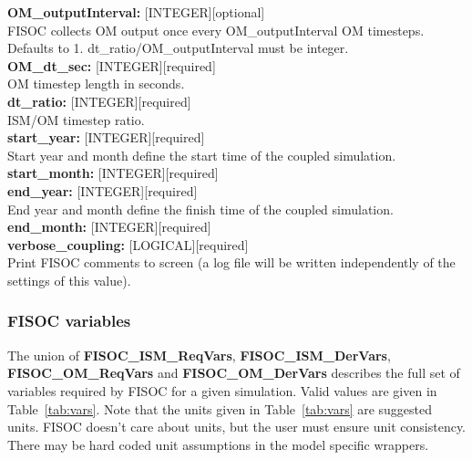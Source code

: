 \documentclass[12pt]{article}
\begin{document}
\begin{flushleft}
\textbf{OM\_outputInterval:} [INTEGER][optional]                           \\
FISOC collects OM output once every OM\_outputInterval OM timesteps. 
Defaults to 1.  dt\_ratio/OM\_outputInterval must be integer.              \\
\vspace{6pt}
\textbf{OM\_dt\_sec:}         [INTEGER][required]                          \\
OM timestep length in seconds.                                             \\
\vspace{6pt}
\textbf{dt\_ratio:}          [INTEGER][required]                           \\
ISM/OM timestep ratio.                                                     \\
\vspace{6pt}
\textbf{start\_year:}        [INTEGER][required]                           \\
Start year and month define the start time of the coupled simulation.      \\
\vspace{6pt}
\textbf{start\_month:}       [INTEGER][required]                           \\
\vspace{6pt}
\textbf{end\_year:}          [INTEGER][required]                           \\
End year and month define the finish time of the coupled simulation.       \\
\vspace{6pt}
\textbf{end\_month:}         [INTEGER][required]                           \\
\vspace{6pt}
\textbf{verbose\_coupling:}  [LOGICAL][required]                           \\
Print FISOC comments to screen (a log file will be written independently of the settings of this value).\\
\end{flushleft}

\subsubsection{FISOC variables}

The union of \textbf{FISOC\_ISM\_ReqVars}, \textbf{FISOC\_ISM\_DerVars}, \textbf{FISOC\_OM\_ReqVars} 
and \textbf{FISOC\_OM\_DerVars} describes the full set of variables required by FISOC for a given simulation. 
Valid values are given in Table~\ref{tab:vars}.
Note that the units given in Table~\ref{tab:vars} are suggested units.  FISOC doesn't care about units, but 
the user must ensure unit consistency.  There may be hard coded unit assumptions in the model specific 
wrappers.
\end{document}
